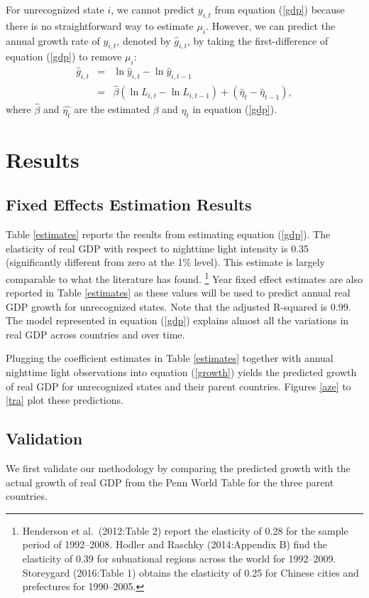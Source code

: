 \documentclass[12pt,a4paper]{article}%
\begin{document}
For unrecognized state $i$, we cannot predict $y_{i,t}$ from equation (\ref{gdp}) because there is no straightforward way to estimate $\mu_i$. However, we can predict the annual growth rate of $y_{i,t}$, denoted by $\hat{g}_{i,t}$, by taking the first-difference of equation (\ref{gdp}) to remove $\mu_i$:
\begin{eqnarray}\label{growth}
\hat{g}_{i,t} 
&=& \ln \hat{y}_{i,t} - \ln \hat{y}_{i, t-1} \nonumber \\
&=& \hat{\beta} (\ln L_{i,t} - \ln L_{i,t-1}) + (\hat{\eta}_t - \hat{\eta}_{t-1}),
\end{eqnarray}
where $\hat{\beta}$ and $\hat{\eta_t}$ are the estimated $\beta$ and $\eta_t$ in equation (\ref{gdp}).

\section{Results}
\subsection{Fixed Effects Estimation Results}
Table \ref{estimates} reports the results from estimating equation (\ref{gdp}). 
The elasticity of real GDP with respect to nighttime light intensity is 0.35 (significantly different from zero at the 1\% level).
This estimate is largely comparable to what the literature has found.%
\footnote{
	Henderson et al.\ (2012:Table 2) report the elasticity of 0.28 for the sample period of 1992--2008. Hodler and Raschky (2014:Appendix B) find the elasticity of 0.39 for subnational regions across the world for 1992--2009. Storeygard (2016:Table 1) obtains the elasticity of 0.25 for Chinese cities and prefectures for 1990--2005. 
}   
Year fixed effect estimates are also reported in Table \ref{estimates} as these values will be used to predict annual real GDP growth for unrecognized states. 
Note that the adjusted R-squared is 0.99. 
The model represented in equation (\ref{gdp}) explains almost all the variations in real GDP across countries and over time. 

Plugging the coefficient estimates in Table \ref{estimates} together with annual nighttime light observations into equation (\ref{growth}) yields the predicted growth of real GDP for unrecognized states and their parent countries. 
Figures \ref{aze} to \ref{tra} plot these predictions.

\subsection{Validation}\label{validation}
We first validate our methodology by comparing the predicted growth with the actual growth of real GDP from the Penn World Table for the three parent countries. 
\end{document}
